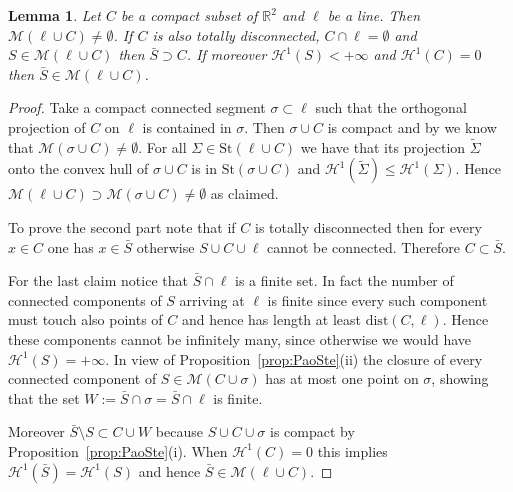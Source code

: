 \documentclass{amsart}
\newcommand{\RR}{\mathbb R}
\renewcommand{\H}{\mathcal H}
\newcommand{\St}{\mathrm{St}}
\newcommand{\M}{\mathcal{M}}
\renewcommand{\H}{\mathcal{H}}
\newcommand{\dist}{\mathrm{dist}}
\newtheorem{lemma}[theorem]{Lemma}
\theoremstyle{definition}
\theoremstyle{remark}
\begin{document}
\begin{lemma}\label{lm:exists}
  Let $C$ be a compact subset of $\RR^2$ and $\ell$ be a line.
  Then $\M(\ell\cup C)\neq \emptyset$.
  If $C$ is also totally disconnected, $C\cap \ell=\emptyset$ 
  and $S\in \M(\ell\cup C)$  
  then $\bar S \supset C$.
  If moreover $\H^1(S)<+\infty$ and $\H^1(C)=0$ 
  then $\bar S\in \M(\ell\cup C)$.
\end{lemma}
\begin{proof}
  Take a compact connected segment $\sigma\subset \ell$ such that 
  the orthogonal projection of $C$ on $\ell$ is contained 
  in $\sigma$. 
  Then $\sigma\cup C$ is compact and by 
  \cite{PaoSte12} we know that 
  $\M(\sigma \cup C)\neq \emptyset$.
  For all $\Sigma \in \St(\ell\cup C)$ we have that its projection 
  $\tilde \Sigma$ 
  onto the convex hull of $\sigma\cup C$ is in $\St(\sigma\cup C)$
  and $\H^1(\tilde \Sigma)\le \H^1(\Sigma)$.
  Hence $\M(\ell\cup C)\supset \M(\sigma\cup C)\neq \emptyset$ as claimed.

  To prove the second part note that if $C$ is totally disconnected 
  then for every $x\in C$ one has $x\in \bar S$ otherwise 
  $S\cup C\cup \ell$ cannot be connected. 
  Therefore $C\subset \bar S$. 
  
  For the last claim notice that $\bar S\cap \ell$ is a finite set.
  In fact the number of connected components of $S$ arriving at $\ell$ 
  is finite since every such component must touch also points of $C$ 
  and hence has length at least $\dist(C,\ell)$.  
  Hence these components cannot be infinitely many,
  since otherwise we would have $\H^1(S)=+\infty$.
  In view of Proposition~\ref{prop:PaoSte}(ii) 
  the closure of every connected component 
  of $S\in\M(C\cup \sigma)$ 
  has at most one point on $\sigma$, showing that the set 
  $W:=\bar S\cap \sigma = \bar S \cap \ell$ 
  is finite.

  Moreover $\bar S \setminus S \subset C\cup W$ because 
  $S\cup C\cup \sigma$ is compact by Proposition~\ref{prop:PaoSte}(i).
  When $\H^1(C)=0$ this implies $\H^1(\bar S)=\H^1(S)$ and hence 
  $\bar S\in \M(\ell\cup C)$.
\end{proof}
\end{document}
